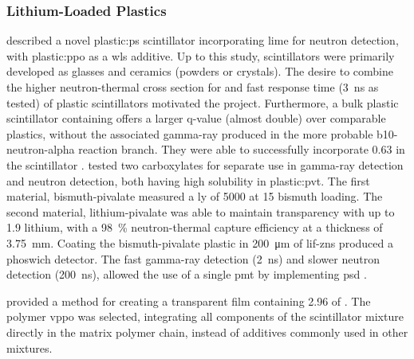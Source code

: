 \documentclass[../../../../main.tex]{subfiles}%
\begin{document}
%
    \subsubsection{Lithium{\--}Loaded Plastics}%
    \label{sec:chapter-2:scintillator-detectors:plastics:lithium-loaded}%
    \citeauthor*{Breukers_2013} described a novel \gls{plastic:ps} scintillator incorporating \gls{lime} for neutron detection, with \gls{plastic:ppo} as a \gls{wls} additive.
    Up to this study,  scintillators were primarily developed as glasses and ceramics (powders or crystals).
    The desire to combine the higher \gls{neutron-thermal} cross section for  and fast response time (\SI{3}{\nano\second} as tested) of plastic scintillators motivated the project.    
    Furthermore, a bulk plastic scintillator containing  offers a larger \gls{q-value} (almost double) over comparable  plastics, without the associated \gls{gamma-ray} produced in the more probable \gls{b10-neutron-alpha} reaction branch.
    They were able to successfully incorporate \SI{0.63}{\percentweight}  in the scintillator \cite{Breukers_2013}.
    \citeauthor*{Cherepy_2015}  tested two carboxylates for separate use in \gls{gamma-ray} detection and neutron detection, both having high solubility in \gls{plastic:pvt}.
    The first material, \gls{bismuth-pivalate} measured a \gls{ly} of \SI{5000}{\lightyield} at \SI{15}{\percentweight} bismuth loading.
    The second material, \gls{lithium-pivalate} was able to maintain transparency with up to \SI{1.9}{\percentweight} lithium, with a \SI{98}{\percent} \gls{neutron-thermal} capture efficiency at a thickness of \SI{3.75}{\milli\meter}.
    Coating the \gls{bismuth-pivalate} plastic in \SI{200}{\micro\meter} of \gls{lif-zns} produced a \gls{phoswich} detector.
    The fast \gls{gamma-ray} detection (\SI{2}{\nano\second}) and slower neutron detection (\SI{200}{\nano\second}), allowed the use of a single \gls{pmt} by implementing \gls{psd} \cite{Cherepy_2015}.
    \par%
    \citeauthor*{Mabe_2014} provided a method for creating a transparent film containing \SI{2.96}{\percentweight} of . 
    The polymer \gls{vppo} was selected, integrating all components of the scintillator mixture directly in the matrix polymer chain, instead of additives commonly used in other mixtures.    
\end{document}
